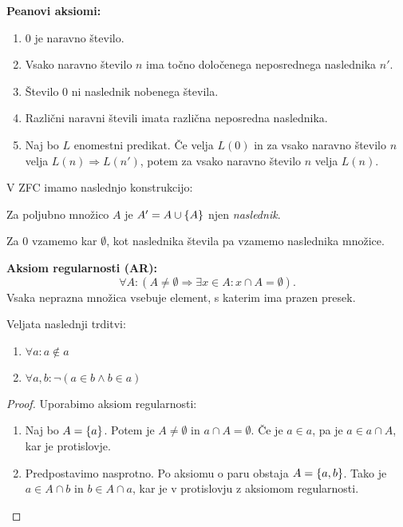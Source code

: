 \documentclass[12pt, a4paper]{article}
\renewcommand{\implies}{\Rightarrow}
\begin{document}
\begin{okvir}
\textbf{Peanovi aksiomi:}

\begin{enumerate}[label=P\arabic*.]
\item $0$ je naravno število.
\item Vsako naravno število $n$ ima točno določenega neposrednega naslednika $n'$.
\item Število $0$ ni naslednik nobenega števila.
\item Različni naravni števili imata različna neposredna naslednika.
\item Naj bo $L$ enomestni predikat. Če velja $L(0)$ in za vsako naravno število $n$ velja $L(n)\implies L(n')$, potem za vsako naravno število $n$ velja $L(n)$.
\end{enumerate}
\end{okvir}

V ZFC imamo naslednjo konstrukcijo:

\begin{definicija}
Za poljubno množico $A$ je $A'=A\cup\left\{A\right\}$ njen \emph{naslednik}.
\end{definicija}

Za $0$ vzamemo kar $\emptyset$, kot naslednika števila pa vzamemo naslednika množice.

\begin{okvir}
\textbf{Aksiom regularnosti (AR):}
\[
\forall A\colon(A\ne\emptyset\implies\exists x\in A\colon x\cap A=\emptyset).
\]
Vsaka neprazna množica vsebuje element, s katerim ima prazen presek.
\end{okvir}

\begin{posledica}
Veljata naslednji trditvi:

\begin{enumerate}
\item $\forall a\colon a\not\in a$
\item $\forall a,b\colon\neg(a\in b\land b\in a)$
\end{enumerate}
\end{posledica}

\begin{proof}
Uporabimo aksiom regularnosti:

\begin{enumerate}
\item Naj bo $A=\left\{a\right\}$. Potem je $A\ne\emptyset$ in $a\cap A=\emptyset$. Če je $a\in a$, pa je $a\in a\cap A$, kar je protislovje.
\item Predpostavimo nasprotno. Po aksiomu o paru obstaja $A=\left\{a,b\right\}$. Tako je $a\in A\cap b$ in $b\in A\cap a$, kar je v protislovju z aksiomom regularnosti.\qedhere
\end{enumerate}
\end{proof}
\end{document}
